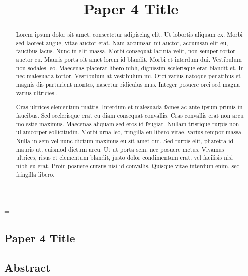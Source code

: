 \emergencystretch=\maxdimen
{}

\begin{refsection}

\title{Paper 4 Title}


\chapter{Paper 4 Title}

\vspace{-2cm}

\section{Abstract}

\vspace{-0.5em}
\begin{abstract}

Lorem ipsum dolor sit amet, consectetur adipiscing elit. Ut lobortis aliquam ex. Morbi sed laoreet augue, vitae auctor erat. Nam accumsan mi auctor, accumsan elit eu, faucibus lacus. Nunc in elit massa. Morbi consequat lacinia velit, non semper tortor auctor eu. Mauris porta sit amet lorem id blandit. Morbi et interdum dui. Vestibulum non sodales leo. Maecenas placerat libero nibh, dignissim scelerisque erat blandit et. In nec malesuada tortor. Vestibulum at vestibulum mi. Orci varius natoque penatibus et magnis dis parturient montes, nascetur ridiculus mus. Integer posuere orci sed magna varius ultricies \cite{example1}.

Cras ultrices elementum mattis. Interdum et malesuada fames ac ante ipsum primis in faucibus. Sed scelerisque erat eu diam consequat convallis. Cras convallis erat non arcu molestie maximus. Maecenas aliquam sed eros id feugiat. Nullam tristique turpis non ullamcorper sollicitudin. Morbi urna leo, fringilla eu libero vitae, varius tempor massa. Nulla in sem vel nunc dictum maximus eu sit amet dui. Sed turpis elit, pharetra id mauris ut, euismod dictum arcu. Ut ut porta sem, nec posuere metus. Vivamus ultrices, risus et elementum blandit, justo dolor condimentum erat, vel facilisis nisi nibh eu erat. Proin posuere cursus nisi id convallis. Quisque vitae interdum enim, sed fringilla libero.

\end{abstract}


\end{refsection}
